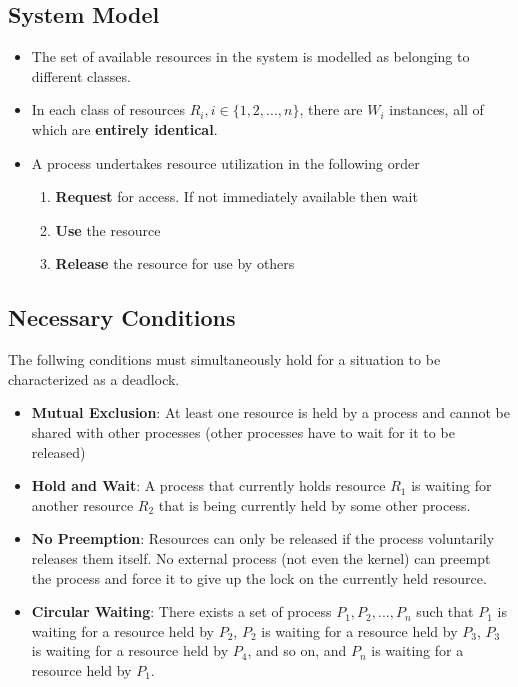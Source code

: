 \documentclass{article}
\theoremstyle{plain}
\theoremstyle{definition}
\begin{document}
\subsection{System Model}
\begin{itemize}
    \item The set of available resources in the system is modelled as belonging to different classes. 
    
    \item In each class of resources $R_i, i \in \{1, 2, ..., n\}$, there are $W_i$ instances, all of which are \textbf{entirely identical}. 
    
    \item A process undertakes resource utilization in the following order
    \begin{enumerate}
        \item \textbf{Request} for access. If not immediately available then wait
        
        \item \textbf{Use} the resource
        
        \item \textbf{Release} the resource for use by others
    \end{enumerate}
\end{itemize}
\subsection{Necessary Conditions}
The follwing conditions must simultaneously hold for a situation to be characterized as a deadlock. 
\begin{itemize}
    \item \textbf{Mutual Exclusion}: At least one resource is held by a process and cannot be shared with other processes (other processes have to wait for it to be released)
    
    \item \textbf{Hold and Wait}: A process that currently holds resource $R_1$ is waiting for another resource $R_2$ that is being currently held by some other process.
    
    \item \textbf{No Preemption}: Resources can only be released if the process voluntarily releases them itself. No external process (not even the kernel) can preempt the process and force it to give up the lock on the currently held resource.
    
    \item \textbf{Circular Waiting}: There exists a set of process $P_1, P_2, ..., P_n$ such that $P_1$ is waiting for a resource held by $P_2$, $P_2$ is waiting for a resource held by $P_3$, $P_3$ is waiting for a resource held by $P_4$, and so on, and $P_n$ is waiting for a resource held by $P_1$. 
\end{itemize}
\end{document}
